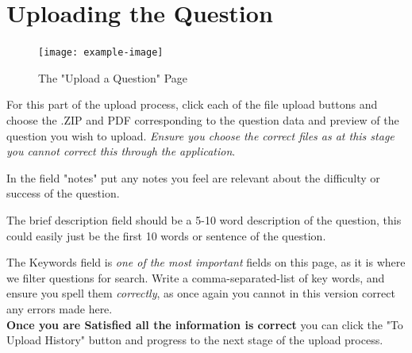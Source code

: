 \documentclass[12pt, a4paper, titlepage]{book}
\begin{document}
\section{Uploading the Question}
\begin{figure}[htp]
\centering
\texttt{[image: example-image]}
\label{fig:upload}
\caption{The "Upload a Question" Page}
\end{figure}
For this part of the upload process, click each of the file upload buttons and choose the .ZIP and PDF corresponding to the question data and preview of the question you wish to upload. \textit{Ensure you choose the correct files as at this stage you cannot correct this through the application}.\par
In the field "notes" put any notes you feel are relevant about the difficulty or success of the question.\par The brief description field should be a 5-10 word description of the question, this could easily just be the first 10 words or sentence of the question.\par The Keywords field is \textit{one of the most important} fields on this page, as it is where we filter questions for search. Write a comma-separated-list of key words, and ensure you spell them \textit{correctly}, as once again you cannot in this version correct any errors made here.
\\
\textbf{Once you are Satisfied all the information is correct} you can click the "To Upload History" button and progress to the next stage of the upload process.\pagebreak
\end{document}
